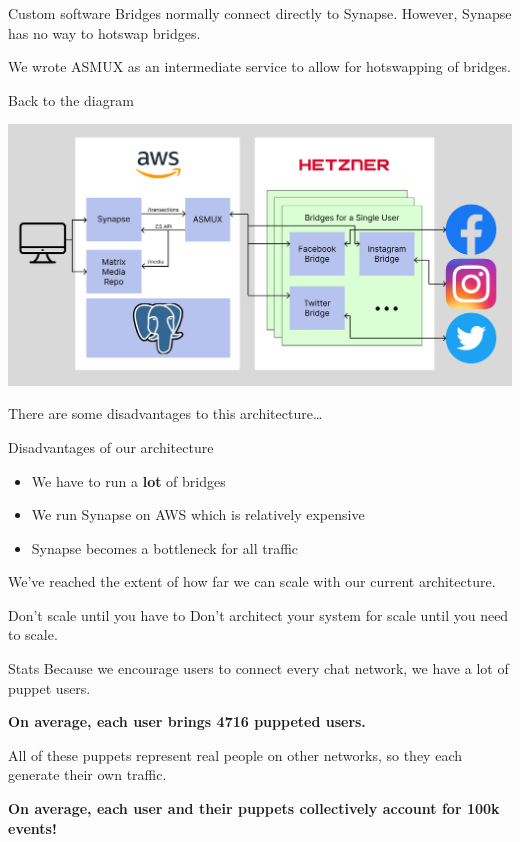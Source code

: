 \documentclass{beeper}
\begin{document}
\begin{frame}{Custom software}
    Bridges normally connect directly to Synapse. However, Synapse has no way to
    hotswap bridges.

    We wrote ASMUX as an intermediate service to allow for hotswapping of
    bridges.
\end{frame}

\begin{frame}{Back to the diagram}
    \centerline{\includegraphics[width=1.15\textwidth]{images/current-architecture}}

    There are some disadvantages to this architecture\ldots
\end{frame}

\begin{frame}{Disadvantages of our architecture}
    \begin{itemize}[<+->]
        \item We have to run a \textbf{lot} of bridges
        \item We run Synapse on AWS which is relatively expensive
        \item Synapse becomes a bottleneck for all traffic
    \end{itemize}
    \pause[\thebeamerpauses]

    We've reached the extent of how far we can scale with our current
    architecture.

    \begin{block}{Don't scale until you have to}
        Don't architect your system for scale until you need to scale.
    \end{block}
\end{frame}

\begin{frame}{Stats}
    Because we encourage users to connect every chat network, we have a lot of
    puppet users.

    \textbf{\large On average, each user brings 4716 puppeted users.}
    \vspace{0.4cm}
    \pause

    All of these puppets represent real people on other networks, so they
    each generate their own traffic.

    \textbf{\large On average, each user and their puppets collectively account
        for 100k events!}
    \vspace{0.4cm}
\end{frame}
\end{document}
